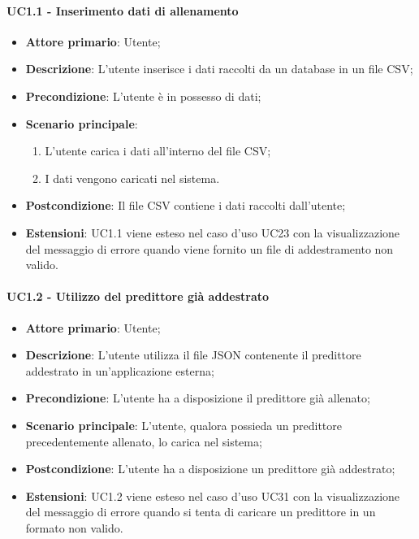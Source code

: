 \paragraph{UC1.1 - Inserimento dati di allenamento}
\label{para:uc1.1}
\begin{itemize}
  \item \textbf{Attore primario}: Utente;
  \item \textbf{Descrizione}: L'utente inserisce i dati raccolti da un database in un file CSV;
  \item \textbf{Precondizione}: L'utente è in possesso di dati;
  \item \textbf{Scenario principale}:
  \begin{enumerate}
    \item L'utente carica i dati all'interno del file CSV;
    \item I dati vengono caricati nel sistema.
  \end{enumerate}
  \item \textbf{Postcondizione}: Il file CSV contiene i dati raccolti dall'utente;
  \item \textbf{Estensioni}: UC1.1 viene esteso nel caso d'uso UC23 con la visualizzazione del messaggio di errore quando viene fornito un file di addestramento non valido.
\end{itemize}

\paragraph{UC1.2 - Utilizzo del predittore già addestrato}
\label{para:uc1.2}
\begin{itemize}
  \item \textbf{Attore primario}: Utente;
  \item \textbf{Descrizione}: L'utente utilizza il file JSON contenente il predittore addestrato in un'applicazione esterna;
  \item \textbf{Precondizione}: L'utente ha a disposizione il predittore già allenato;
  \item \textbf{Scenario principale}: L'utente, qualora possieda un predittore precedentemente allenato, lo carica nel sistema;
  \item \textbf{Postcondizione}: L'utente ha a disposizione un predittore già addestrato;
  \item \textbf{Estensioni}: UC1.2 viene esteso nel caso d'uso UC31 con la visualizzazione del messaggio di errore quando si tenta di caricare un predittore in un formato non valido.
\end{itemize}

